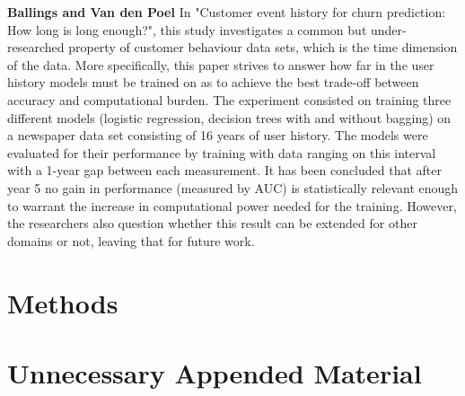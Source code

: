 \documentclass{kththesis}
\begin{document}
\textbf{Ballings and Van den Poel} \citep{Ballings2012} In "Customer event history for churn prediction: How long is long enough?", this study investigates a common but under-researched property of customer behaviour data sets, which is the time dimension of the data. More specifically, this paper strives to answer how far in the user history models must be trained on as to achieve the best trade-off between accuracy and computational burden. The experiment consisted on training three different models (logistic regression, decision trees with and without bagging) on a newspaper data set consisting of 16 years of user history. The models were evaluated for their performance by training with data ranging on this interval with a 1-year gap between each measurement. It has been concluded that  after year 5 no gain in performance (measured by AUC) is statistically relevant enough to warrant the increase in computational power needed for the training. However, the researchers also question whether this result can be extended for other domains or not, leaving that for future work.

\chapter{Methods}

\lipsum



\appendix

\chapter{Unnecessary Appended Material}
\end{document}
